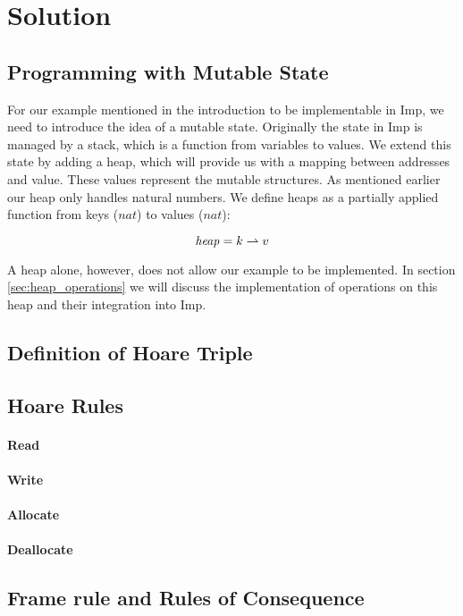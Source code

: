 \section{Solution}
\subsection{Programming with Mutable State}
For our example mentioned in the introduction to be implementable in Imp, we need to introduce the idea of a mutable state. Originally the state in Imp is managed by a stack, which is a function from variables to values. We extend this state by adding a heap, which will provide us with a mapping between addresses and value. These values represent the mutable structures. As mentioned earlier our heap only handles natural numbers. We define heaps as a partially applied function from keys ($nat$) to values ($nat$):

\[
\mathit{heap} = k\rightharpoonup v
\] 

A heap alone, however, does not allow our example to be implemented. In section \ref{sec:heap_operations} we will discuss the implementation of operations on this heap and their integration into Imp.



\subsection{Definition of Hoare Triple}

\subsection{Hoare Rules}
\paragraph{Read}
\paragraph{Write}
\paragraph{Allocate}
\paragraph{Deallocate}
\subsection{Frame rule and Rules of Consequence}

